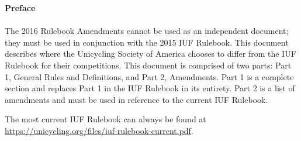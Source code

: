 {\huge \bf{Preface} \\}
\thispagestyle{plain}
\setcounter{page}{3}
\\
The 2016 Rulebook Amendments cannot be used as an independent document; they must be used in conjunction with the 2015 IUF Rulebook. 
This document describes where the Unicycling Society of America chooses to differ from the IUF Rulebook for their competitions.
This document is comprised of two parts: Part 1, General Rules and Definitions, and Part 2, Amendments.
Part 1 is a complete section and replaces Part 1 in the IUF Rulebook in its entirety.
Part 2 is a list of amendments and must be used in reference to the current IUF Rulebook.

The most current IUF Rulebook can always be found at \url{https://unicycling.org/files/iuf-rulebook-current.pdf}.